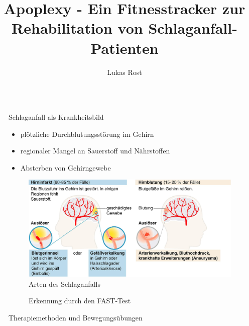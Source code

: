 \documentclass[final,20pt]{beamer}
\title{Apoplexy - Ein Fitnesstracker zur Rehabilitation von Schlaganfall-Patienten}
\author{Lukas Rost}
\institute{Albert-Schweitzer-Gymnasium Erfurt}
\newlength{\sepwidth}
\newlength{\colwidth}
\newcommand{\separatorcolumn}{\begin{column}{\sepwidth}\end{column}}
\begin{document}
\begin{frame}[t]
\begin{columns}[t]
\separatorcolumn

\begin{column}{\colwidth}

  \begin{alertblock}{Schlaganfall als Krankheitsbild}
  	\begin{itemize}
  		\item plötzliche Durchblutungsstörung im Gehirn
  		\item regionaler Mangel an Sauerstoff und Nährstoffen
  		\item Absterben von Gehirngewebe
  	\end{itemize}
  \begin{figure}[H]
  	\centering
  	\includegraphics[width=0.8\colwidth]{pics/sentst}
  	\caption{Arten des Schlaganfalls}
  \end{figure}  
  	\begin{figure}[H]
  		\centering
  		
  		\caption{Erkennung durch den FAST-Test}
  	\end{figure}

  \end{alertblock}

  \begin{alertblock}{Therapiemethoden und Bewegungsübungen}

    \begin{figure}[H]
    	\centering
    	
    \end{figure}


\end{alertblock}
\end{column}
\end{columns}
\end{frame}
\end{document}
